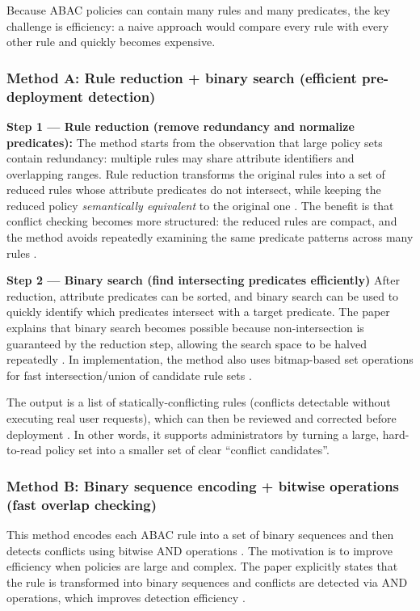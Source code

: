 Because ABAC policies can contain many rules and many predicates, the key challenge is efficiency: a naive approach would compare every rule with every other rule and quickly becomes expensive.

\subsubsection*{Method A: Rule reduction + binary search (efficient pre-deployment detection)}
\textbf{Step 1 — Rule reduction (remove redundancy and normalize predicates):}  
The method starts from the observation that large policy sets contain redundancy: multiple rules may share attribute identifiers and overlapping ranges. Rule reduction transforms the original rules into a set of reduced rules whose attribute predicates do not intersect, while keeping the reduced policy \emph{semantically equivalent} to the original one \cite{Shu2009Conflicts}. The benefit is that conflict checking becomes more structured: the reduced rules are compact, and the method avoids repeatedly examining the same predicate patterns across many rules \cite{Shu2009Conflicts}.
\vspace{0.5cm}


\textbf{Step 2 — Binary search (find intersecting predicates efficiently)}  
After reduction, attribute predicates can be sorted, and binary search can be used to quickly identify which predicates intersect with a target predicate. The \cite{Shu2009Conflicts} paper explains that binary search becomes possible because non-intersection is guaranteed by the reduction step, allowing the search space to be halved repeatedly \cite{Shu2009Conflicts}. In implementation, the method also uses bitmap-based set operations for fast intersection/union of candidate rule sets \cite{Shu2009Conflicts}. 
\vspace{0.5cm}


The output is a list of statically-conflicting rules (conflicts detectable without executing real user requests), which can then be reviewed and corrected before deployment \cite{Shu2009Conflicts}. In other words, it supports administrators by turning a large, hard-to-read policy set into a smaller set of clear “conflict candidates”.

\subsubsection*{Method B: Binary sequence encoding + bitwise operations (fast overlap checking)}
This method encodes each ABAC rule into a set of binary sequences and then detects conflicts using bitwise AND operations \cite{Zheng2019ABAC}. The motivation is to improve efficiency when policies are large and complex. The paper explicitly states that the rule is transformed into binary sequences and conflicts are detected via AND operations, which improves detection efficiency \cite{Zheng2019ABAC}.  
\vspace{0.5cm}


